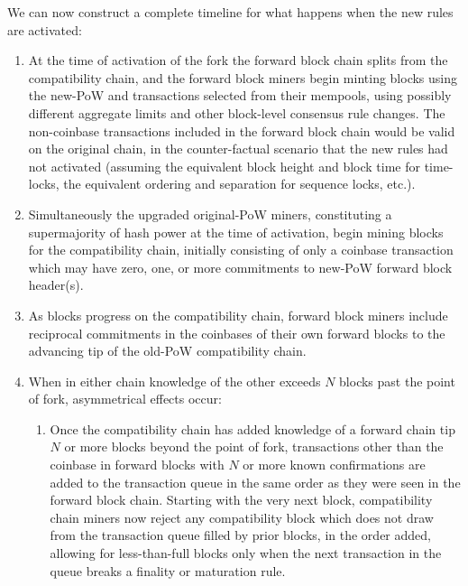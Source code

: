 We can now construct a complete timeline for what happens when the new
rules are activated:

\begin{enumerate}

  \item

    At the time of activation of the fork the forward block chain
    splits from the compatibility chain, and the forward block miners
    begin minting blocks using the new-PoW and transactions selected
    from their mempools, using possibly different aggregate limits and
    other block-level consensus rule changes.  The non-coinbase
    transactions included in the forward block chain would be valid on
    the original chain, in the counter-factual scenario that the new
    rules had not activated (assuming the equivalent block height and
    block time for time-locks, the equivalent ordering and separation
    for sequence locks, etc.).

  \item

    Simultaneously the upgraded original-PoW miners, constituting a
    supermajority of hash power at the time of activation, begin
    mining blocks for the compatibility chain, initially consisting of
    only a coinbase transaction which may have zero, one, or more
    commitments to new-PoW forward block header(s).

  \item

    As blocks progress on the compatibility chain, forward block
    miners include reciprocal commitments in the coinbases of their
    own forward blocks to the advancing tip of the old-PoW
    compatibility chain.

  \item

    When in either chain knowledge of the other exceeds $N$ blocks
    past the point of fork, asymmetrical effects occur:

    \begin{enumerate}

      \item

        Once the compatibility chain has added knowledge of a forward
        chain tip $N$ or more blocks beyond the point of fork,
        transactions other than the coinbase in forward blocks with
        $N$ or more known confirmations are added to the transaction
        queue in the same order as they were seen in the forward block
        chain.  Starting with the very next block, compatibility chain
        miners now reject any compatibility block which does not draw
        from the transaction queue filled by prior blocks, in the
        order added, allowing for less-than-full blocks only when the
        next transaction in the queue breaks a finality or maturation
        rule.


\end{enumerate}
\end{enumerate}

